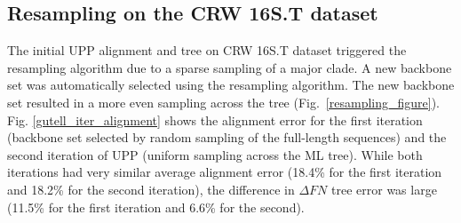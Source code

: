 
\clearpage
\subsection{Resampling on the CRW 16S.T dataset}\label{resample_16S}
The initial UPP alignment and tree on CRW 16S.T dataset triggered the resampling algorithm due to a sparse sampling of a major clade.
A new backbone set was automatically selected using the resampling algorithm.  The new backbone set resulted in a more even sampling across the tree (Fig.~\ref{resampling_figure}).  Fig. \ref{gutell_iter_alignment} shows the alignment error for the first iteration (backbone set selected by random sampling of the full-length sequences) and the second iteration of UPP (uniform sampling across the ML tree).  While both iterations had very similar average alignment error 
(18.4\% for the first iteration and 18.2\% for the second iteration), 
the difference in $\Delta{FN}$ tree error was large (11.5\% 
for the first iteration and 6.6\% for the second).  

